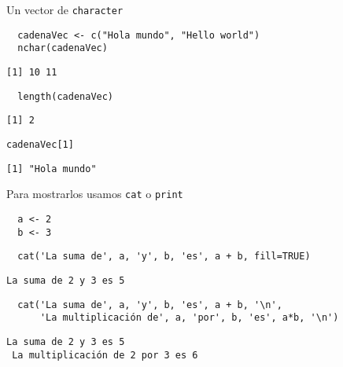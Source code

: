 \documentclass[xcolor={usenames,svgnames,dvipsnames}]{beamer}
\begin{document}
\begin{frame}[fragile,label={sec:org29b672e}]{Un vector de \texttt{character}}
 \lstset{language=r,label= ,caption= ,captionpos=b,numbers=none}
\begin{lstlisting}
  cadenaVec <- c("Hola mundo", "Hello world")
  nchar(cadenaVec)
\end{lstlisting}

\begin{verbatim}
[1] 10 11
\end{verbatim}

\lstset{language=r,label= ,caption= ,captionpos=b,numbers=none}
\begin{lstlisting}
  length(cadenaVec)
\end{lstlisting}

\begin{verbatim}
[1] 2
\end{verbatim}

\lstset{language=r,label= ,caption= ,captionpos=b,numbers=none}
\begin{lstlisting}
cadenaVec[1]
\end{lstlisting}

\begin{verbatim}
[1] "Hola mundo"
\end{verbatim}
\end{frame}

\begin{frame}[fragile,label={sec:org5bf6808}]{Para mostrarlos usamos \texttt{cat} o \texttt{print}}
 \lstset{language=r,label= ,caption= ,captionpos=b,numbers=none}
\begin{lstlisting}
  a <- 2
  b <- 3
\end{lstlisting}

\lstset{language=r,label= ,caption= ,captionpos=b,numbers=none}
\begin{lstlisting}
  cat('La suma de', a, 'y', b, 'es', a + b, fill=TRUE)
\end{lstlisting}

\begin{verbatim}
La suma de 2 y 3 es 5
\end{verbatim}

\lstset{language=r,label= ,caption= ,captionpos=b,numbers=none}
\begin{lstlisting}
  cat('La suma de', a, 'y', b, 'es', a + b, '\n',
      'La multiplicación de', a, 'por', b, 'es', a*b, '\n')
\end{lstlisting}

\begin{verbatim}
La suma de 2 y 3 es 5 
 La multiplicación de 2 por 3 es 6
\end{verbatim}
\end{frame}
\end{document}
